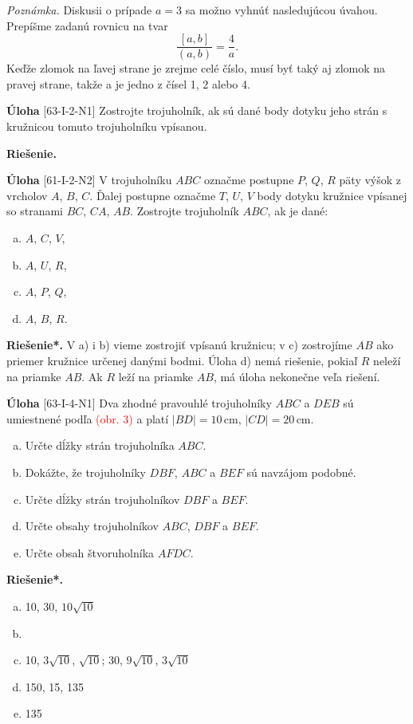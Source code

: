 \documentclass{article}
\newcommand{\rie}{\textbf{Riešenie.} }
\newcommand{\rieh}{\textbf{Riešenie*.} }
\newcommand\todo[1]{\noindent\textcolor{red}{(#1)}}
\newcommand{\problem}[4]{
  \begin{tcolorbox}[breakable,notitle,boxrule=0pt,colback=light-gray,colframe=light-gray]
    \textbf{Úloha}
    [#1] #3
  \end{tcolorbox}
  \noindent#4
}
\begin{document}
{\textit{Poznámka.} Diskusii o prípade $a = 3$ sa možno vyhnúť nasledujúcou úvahou. Prepíšme zadanú rovnicu na tvar
$$\frac{[a, b]}{(a, b)}=\frac{4}{a}.$$
Keďže zlomok na ľavej strane je zrejme celé číslo, musí byť taký aj zlomok na pravej strane, takže a je jedno z čísel 1, 2 alebo 4.
}


\problem{63-I-2-N1}{}{
Zostrojte trojuholník, ak sú dané body dotyku jeho strán s kružnicou tomuto trojuholníku vpísanou.
}{
\rie
}


\problem{61-I-2-N2}{}{
V trojuholníku $ABC$ označme postupne $P$, $Q$, $R$ päty výšok z vrcholov $A$, $B$, $C$. Ďalej postupne označme $T$, $U$, $V$ body dotyku kružnice vpísanej so stranami $BC$, $CA$, $AB$.
Zostrojte trojuholník $ABC$, ak je dané:
\begin{enumerate}[a)]
    \item $A$, $C$, $V$,
    \item $A$, $U$, $R$,
    \item $A$, $P$, $Q$,
    \item $A$, $B$, $R$.
\end{enumerate}
}{
\rieh V a) i b) vieme zostrojiť vpísanú kružnicu; v c) zostrojíme $AB$ ako priemer kružnice určenej danými bodmi. Úloha d) nemá riešenie, pokiaľ $R$ neleží na priamke $AB$. Ak $R$ leží na priamke $AB$, má úloha nekonečne veľa riešení.
}

\problem{63-I-4-N1}{}{
Dva zhodné pravouhlé trojuholníky $ABC$ a $DEB$ sú umiestnené podľa \todo{obr. 3} a platí $|BD| = 10$\,cm, $|CD| = 20$\,cm.
\begin{enumerate}[a)]
    \item Určte dĺžky strán trojuholníka $ABC$.
    \item Dokážte, že trojuholníky $DBF$, $ABC$ a $BEF$ sú navzájom podobné.
    \item Určte dĺžky strán trojuholníkov $DBF$ a $BEF$.
    \item Určte obsahy trojuholníkov $ABC$, $DBF$ a $BEF$.
    \item Určte obsah štvoruholníka $AFDC$.
\end{enumerate}
}{
\rieh \begin{enumerate}[a)]
    \item 10, 30, $10\sqrt{10}$
    \item
    \item 10, $3\sqrt{10}$, $\sqrt{10}$; 30, $9\sqrt{10}$, $3\sqrt{10}$
    \item 150, 15, 135
    \item 135
\end{enumerate}
}
\end{document}
